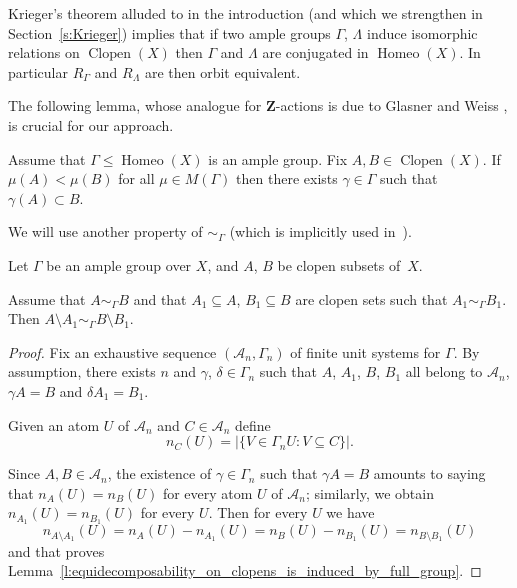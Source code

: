 \documentclass[AHL,Unicode]{cedram}
\DeclareMathOperator{\Homeo}{Homeo}
\DeclareMathOperator{\Clopen}{Clopen}
\newcommand{\Z}{\mathbf{Z}}
\newcommand{\mcA}{\mathcal{A}}
\begin{document}
Krieger's theorem alluded to in the introduction (and which we strengthen in Section~\ref{s:Krieger}) implies that if two ample groups $\Gamma$, $\Lambda$ induce isomorphic relations on $\Clopen(X)$ then $\Gamma$ and $\Lambda$ are conjugated in $\Homeo(X)$. In particular $R_\Gamma$ and $R_\Lambda$ are then orbit equivalent.


The following lemma, whose analogue for $\Z$-actions is due to Glasner and Weiss \cite{Glasner1995a}, is crucial for our approach.


\begin{lemm}\label{l:Glasner_Weiss}
Assume that $\Gamma \le \Homeo(X)$ is an ample group. Fix $A,B \in \Clopen(X)$. If $\mu(A) < \mu(B)$ for all $\mu \in M(\Gamma)$ then there exists $\gamma \in \Gamma$ such that $\gamma(A)\subset B$.
\end{lemm}



We will use another property of $\sim_\Gamma$ (which is implicitly used in~\cite{Melleray2023}).

\begin{lemm}\label{l:equidecomposability_on_clopens_is_induced_by_full_group}
Let $\Gamma$ be an ample group over $X$, and $A$, $B$ be clopen subsets of~$X$.

Assume that $A \sim_\Gamma B$ and that $A_1 \subseteq A$, $B_1 \subseteq B$ are clopen sets such that $A_1 \sim_\Gamma B_1$. Then $A \setminus A_1 \sim_\Gamma B \setminus B_1$.
\end{lemm}

\begin{proof}
Fix an exhaustive sequence $(\mcA_n,\Gamma_n)$ of finite unit systems for $\Gamma$. By assumption, there exists $n$ and $\gamma$, $\delta \in \Gamma_n$ such that $A$, $A_1$, $B$, $B_1$ all belong to $\mcA_n$, $\gamma A=B$ and $\delta A_1=B_1$.

Given an atom $U$ of $\mcA_n$ and $C \in \mcA_n$ define
\[
n_C(U)= \left|\{V \in \Gamma_n U : V \subseteq C\}\right|.
\]

Since $A,B \in \mcA_n$, the existence of $\gamma \in \Gamma_n$ such that $\gamma A=B$ amounts to saying that $n_A(U)=n_B(U)$ for every atom $U$ of $\mcA_n$; similarly, we obtain $n_{A_1}(U)= n_{B_1}(U)$ for every $U$. Then for every $U$ we have
\[
n_{A \setminus A_1}(U)=n_A(U) - n_{A_1}(U) = n_B(U)-n_{B_1}(U) = n_{B \setminus B_1}(U)
\]
and that proves Lemma~\ref{l:equidecomposability_on_clopens_is_induced_by_full_group}.
\end{proof}
\end{document}
